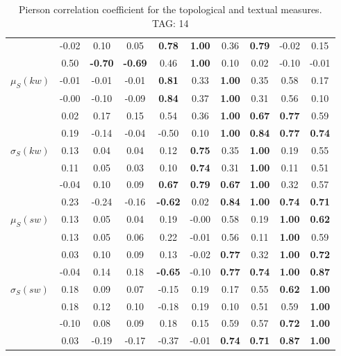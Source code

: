 \begin{table*}[h!]
\begin{center}
\begin{tabular}{| l || c | c | c | c | c | c | c | c | c |}
 & -0.02 & 0.10 & 0.05 & {\bf 0.78} & {\bf 1.00} & 0.36 & {\bf 0.79} & -0.02 & 0.15 \\
 & 0.50 & {\bf -0.70} & {\bf -0.69} & 0.46 & {\bf 1.00} & 0.10 & 0.02 & -0.10 & -0.01 \\\hline
$\mu_S(kw)$ & -0.01 & -0.01 & -0.01 & {\bf 0.81} & 0.33 & {\bf 1.00} & 0.35 & 0.58 & 0.17 \\
 & -0.00 & -0.10 & -0.09 & {\bf 0.84} & 0.37 & {\bf 1.00} & 0.31 & 0.56 & 0.10 \\
 & 0.02 & 0.17 & 0.15 & 0.54 & 0.36 & {\bf 1.00} & {\bf 0.67} & {\bf 0.77} & 0.59 \\
 & 0.19 & -0.14 & -0.04 & -0.50 & 0.10 & {\bf 1.00} & {\bf 0.84} & {\bf 0.77} & {\bf 0.74} \\\hline
$\sigma_S(kw)$ & 0.13 & 0.04 & 0.04 & 0.12 & {\bf 0.75} & 0.35 & {\bf 1.00} & 0.19 & 0.55 \\
 & 0.11 & 0.05 & 0.03 & 0.10 & {\bf 0.74} & 0.31 & {\bf 1.00} & 0.11 & 0.51 \\
 & -0.04 & 0.10 & 0.09 & {\bf 0.67} & {\bf 0.79} & {\bf 0.67} & {\bf 1.00} & 0.32 & 0.57 \\
 & 0.23 & -0.24 & -0.16 & {\bf -0.62} & 0.02 & {\bf 0.84} & {\bf 1.00} & {\bf 0.74} & {\bf 0.71} \\\hline
$\mu_S(sw)$ & 0.13 & 0.05 & 0.04 & 0.19 & -0.00 & 0.58 & 0.19 & {\bf 1.00} & {\bf 0.62} \\
 & 0.13 & 0.05 & 0.06 & 0.22 & -0.01 & 0.56 & 0.11 & {\bf 1.00} & 0.59 \\
 & 0.03 & 0.10 & 0.09 & 0.13 & -0.02 & {\bf 0.77} & 0.32 & {\bf 1.00} & {\bf 0.72} \\
 & -0.04 & 0.14 & 0.18 & {\bf -0.65} & -0.10 & {\bf 0.77} & {\bf 0.74} & {\bf 1.00} & {\bf 0.87} \\\hline
$\sigma_S(sw)$ & 0.18 & 0.09 & 0.07 & -0.15 & 0.19 & 0.17 & 0.55 & {\bf 0.62} & {\bf 1.00} \\
 & 0.18 & 0.12 & 0.10 & -0.18 & 0.19 & 0.10 & 0.51 & 0.59 & {\bf 1.00} \\
 & -0.10 & 0.08 & 0.09 & 0.18 & 0.15 & 0.59 & 0.57 & {\bf 0.72} & {\bf 1.00} \\
 & 0.03 & -0.19 & -0.17 & -0.37 & -0.01 & {\bf 0.74} & {\bf 0.71} & {\bf 0.87} & {\bf 1.00} \\\hline
\end{tabular}
\caption{Pierson correlation coefficient for the topological and textual measures. TAG: 14}
\end{center}
\end{table*}
